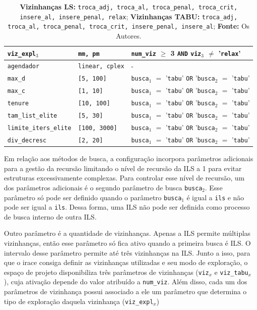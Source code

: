 \begin{table}[h!]
\begin{tabularx}{\textwidth}{l >{\raggedright\arraybackslash}X X}
\texttt{viz\_expl$_3$} & \texttt{mm, pm} & \texttt{num\_viz} $\geq$ 3 \texttt{AND} \texttt{viz}$_3$ $\neq$ '\texttt{relax}'\\ \hline
\texttt{agendador} & \texttt{linear, cplex} & - \\ \hline
\texttt{max\_d} & \texttt{[5, 100]} & \texttt{busca$_1$} $=$ '\texttt{tabu}' \texttt{OR} '\texttt{busca$_2$} $=$ '\texttt{tabu}' \\ \hline
\texttt{max\_c} & \texttt{[1, 10]} & \texttt{busca$_1$} $=$ '\texttt{tabu}' \texttt{OR} '\texttt{busca$_2$} $=$ '\texttt{tabu}'\\ \hline
\texttt{tenure} & \texttt{[10, 100]} & \texttt{busca$_1$} $=$ '\texttt{tabu}' \texttt{OR} '\texttt{busca$_2$} $=$ '\texttt{tabu}'\\ \hline
\texttt{tam\_list\_elite} & \texttt{[5, 30]} & \texttt{busca$_1$} $=$ '\texttt{tabu}' \texttt{OR} '\texttt{busca$_2$} $=$ '\texttt{tabu}'\\ \hline
\texttt{limite\_iters\_elite} & \texttt{[100, 3000]} & \texttt{busca$_1$} $=$ '\texttt{tabu}' \texttt{OR} '\texttt{busca$_2$} $=$ '\texttt{tabu}' \\ \hline
\texttt{div\_decresc} & \texttt{[2, 20]} & \texttt{busca$_1$} $=$ '\texttt{tabu}' \texttt{OR} '\texttt{busca$_2$} $=$ '\texttt{tabu}'\\ \hline
\end{tabularx}
    \caption*{\small \textbf{Vizinhanças LS:} \texttt{troca\_adj, troca\_al, troca\_penal, troca\_crit, insere\_al, insere\_penal, relax};
\textbf{Vizinhanças TABU:} \texttt{troca\_adj, troca\_al, troca\_penal,  troca\_crit, insere\_penal, insere\_al}; \textbf{Fonte:} Os Autores.}
\end{table}

Em relação aos métodos de busca, a configuração incorpora parâmetros adicionais para a gestão da recursão limitando o nível de recursão da \ac{ILS} a 1 para evitar estruturas excessivamente complexas. Para controlar esse nível de recursão, um dos parâmetros adicionais é o segundo parâmetro de busca \texttt{busca$_2$}. Esse parâmetro só pode ser definido quando o parâmetro \texttt{busca$_1$} é igual a \texttt{ils} e não pode ser igual a \texttt{ils}. Dessa forma, uma \ac{ILS} não pode ser definida como processo de busca interno de outra \ac{ILS}.

Outro parâmetro é a quantidade de vizinhanças. Apenas a \ac{ILS} permite múltiplas vizinhanças, então esse parâmetro só fica ativo quando a primeira busca é \ac{ILS}. O intervalo desse parâmetro permite até três vizinhanças na \ac{ILS}. Junto a isso, para que o irace consiga definir as vizinhanças utilizadas e seu modo de exploração, o espaço de projeto disponibiliza três parâmetros de vizinhanças (\texttt{viz}$_x$ e \texttt{viz\_tabu}$_x$), cuja ativação depende do valor atribuído a \texttt{num\_viz}. Além disso, cada um dos parâmetros de vizinhança possui associado a ele um parâmetro que determina o tipo de exploração daquela vizinhança (\texttt{viz\_expl}$_x$) 

